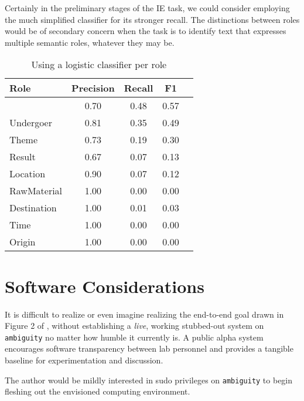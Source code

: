 \documentclass{article} %
\def\func#1{\textrm{\bf{\sc{#1}}}}
\begin{document}
Certainly in the preliminary stages of the IE task, we could consider employing the much simplified \func{semantic} classifier for its stronger recall.  The distinctions between roles would be of secondary concern when the task is to identify text that expresses multiple semantic roles, whatever they may be.
\begin{table}[ht]
\centering
\renewcommand{\arraystretch}{1.4}
\begin{tabular}{l c c c c} \toprule
Role & Precision & Recall & F1 \\ \midrule
\func{semantic} & 0.70 & 0.48 & 0.57 \\
Undergoer & 0.81 & 0.35 & 0.49 \\
Theme & 0.73 & 0.19 & 0.30 \\
Result & 0.67 & 0.07 & 0.13 \\
Location & 0.90 & 0.07 & 0.12 \\
RawMaterial & 1.00 & 0.00 & 0.00 \\
Destination & 1.00 & 0.01 & 0.03 \\
Time & 1.00 & 0.00 & 0.00 \\
Origin & 1.00 & 0.00 & 0.00 \\
\bottomrule
\end{tabular}
\caption{Using a logistic classifier per role}\label{binarize}
\end{table}
\section{Software Considerations}
It is difficult to realize or even imagine realizing the end-to-end goal drawn in Figure 2 of \cite{bala}, without establishing a {\em live}, working stubbed-out system on {\tt ambiguity} no matter how humble it currently is.  A public alpha system encourages software transparency between lab personnel and provides a tangible baseline for experimentation and discussion.

The author would be mildly interested in sudo privileges on {\tt ambiguity} to begin fleshing out the envisioned computing environment.
\end{document}
